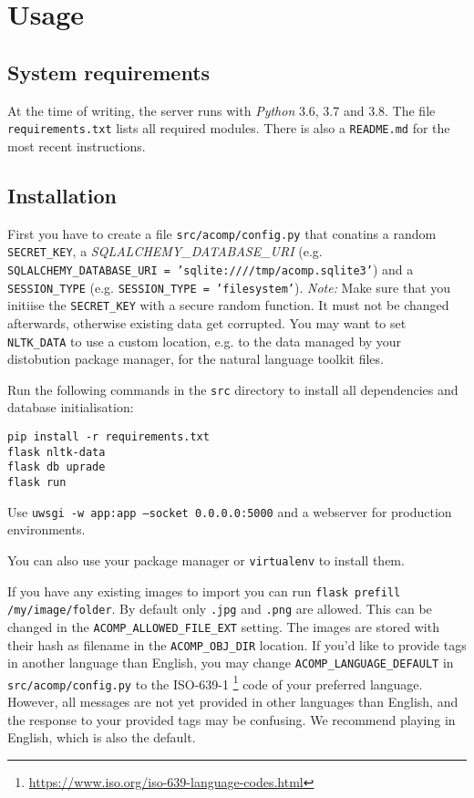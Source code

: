 \section{Usage}
\label{gacomphs19:sec:usage}

\subsection{System requirements}
\label{gacomphs19:sec:usage:requirements}
At the time of writing, the server runs with \textit{Python} 3.6, 3.7 and 3.8. The file
\texttt{requirements.txt} lists all required modules.
There is also a \texttt{README.md} for the most recent instructions.

\subsection{Installation}
\label{gacomphs19:sec:usage:instllation}
First you have to create a file \texttt{src/acomp/config.py} that conatins
a random \texttt{SECRET\_KEY}, a \textit{SQLALCHEMY\_DATABASE\_URI}
(e.g. \texttt{SQLALCHEMY\_DATABASE\_URI = 'sqlite:////tmp/acomp.sqlite3'}) and
a \texttt{SESSION\_TYPE} (e.g. \texttt{SESSION\_TYPE = 'filesystem'}).
\textit{Note:} Make sure that you initiise the \texttt{SECRET\_KEY} with a secure random function.
It must not be changed afterwards, otherwise existing data get corrupted.
You may want to set \texttt{NLTK\_DATA} to use a custom location, e.g. to the data
managed by your distobution package manager, for the natural language toolkit files.

Run the following commands in the \texttt{src} directory to install all dependencies and
database initialisation:

\begin{verbatim}
pip install -r requirements.txt
flask nltk-data
flask db uprade
flask run
\end{verbatim}

Use \texttt{uwsgi -w app:app --socket 0.0.0.0:5000} and a webserver for production environments.

You can also use your package manager or \texttt{virtualenv} to install them.

If you have any existing images to import you can run
\texttt{flask prefill /my/image/folder}. By default only \texttt{.jpg} and \texttt{.png}
are allowed. This can be changed in the \texttt{ACOMP\_ALLOWED\_FILE\_EXT} setting. The
images are stored with their hash as filename in the \texttt{ACOMP\_OBJ\_DIR} location.
If you'd like to provide tags in another language than English, you may change
\texttt{ACOMP\_LANGUAGE\_DEFAULT} in \texttt{src/acomp/config.py} to the
ISO-639-1 \footnote{\url{https://www.iso.org/iso-639-language-codes.html}} code of your preferred language.
However, all messages are not yet provided in other languages than English,
and the response to your provided tags may be confusing.
We recommend playing in English, which is also the default.

